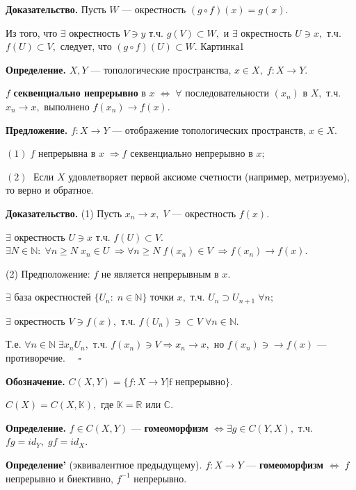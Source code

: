 \documentclass[12pt,a4paper]{article}
\begin{document}
\textbf{Доказательство.} Пусть $W$ --- окрестность $(g \circ f)(x) = g(x).$ 

Из того, что $\exists$ окрестность $V \ni y$ т.ч. $g(V) \subset W,$ и $\exists$ окрестность $U \ni x,$ т.ч. $f(U) \subset V,$ следует, что $(g \circ f)(U) \subset W.$ Картинка1 

\textbf{Определение.} $X, Y$ --- топологические пространства, $x \in X, \; f: X \to Y.$ 

$f$ \textbf{секвенциально непрерывно} в $x \; \Leftrightarrow \; \forall$ последовательности $(x_{n})$ в $X,$ т.ч. $x_{n} \to x,$ выполнено $f(x_{n}) \to f(x).$ 

\textbf{Предложение.} $f: X \to Y$ --- отображение топологических пространств, $x \in X.$ 

$(1) \; f$ непрерывна в $x \; \Rightarrow f$ секвенциально непрерывно в $x;$

$(2) \;$ Если $X$ удовлетворяет первой аксиоме счетности (например, метризуемо), то верно и обратное. 

\textbf{Доказательство.} (1) Пусть $x_{n} \to x, \; V$ --- окрестность $f(x).$ 

$\exists$ окрестность $U \ni x$ т.ч. $f(U) \subset V.$ $\exists N \in \mathbb{N}: \; \forall  n \geq N \; x_{n} \in U \; \Rightarrow \forall n \geq N \; f(x_{n}) \in V \; \Rightarrow f(x_{n}) \to f(x).$ 

(2) Предположение: $f$ не является непрерывным в $x.$ 

$\exists$ база окрестностей $\{U_{n}: \; n \in \mathbb{N}\}$ точки $x,$ т.ч. $U_{n} \supset U_{n + 1} \; \forall n;$ 

$\exists$ окрестность $V \ni f(x),$ т.ч. $f(U_{n}) \ni \subset V \; \forall n \in \mathbb{N}.$ 

Т.е. $\forall n \in \mathbb{N} \; \exists x_{n} U_{n},$ т.ч. $f(x_{n}) \ni V \Rightarrow x_{n} \to x,$ но $f(x_{n}) \ni \rightarrow f(x)$ --- противоречие. $\quad \square$ 

\textbf{Обозначение.} $C(X, Y) = \{f: X \to Y | \text{f непрерывно}\}.$ 

$C(X) = C(X, \mathbb{K}),$ где $\mathbb{K} = \mathbb{R}$ или $\mathbb{C}.$

\textbf{Определение.} $f \in C(X, Y)$ --- \textbf{гомеоморфизм} $\Leftrightarrow \exists g \in C(Y, X),$ т.ч. $fg = id_{Y}, \; gf = id_{X}.$ 

\textbf{Определение'} (эквивалентное предыдущему). $f: X \to Y$ --- \textbf{гомеоморфизм} $\Leftrightarrow \; f$ непрерывно и биективно, $f^{-1}$ непрерывно. 
\end{document}
